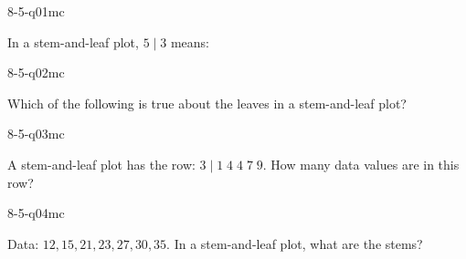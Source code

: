 

\begin{practiceQuestion}{8-5-q01}{mc}
\begin{questionText}
In a stem-and-leaf plot, $5 \mid 3$ means:
\end{questionText}
\end{practiceQuestion}

\begin{practiceQuestion}{8-5-q02}{mc}
\begin{questionText}
Which of the following is true about the leaves in a stem-and-leaf plot?
\end{questionText}
\end{practiceQuestion}

\begin{practiceQuestion}{8-5-q03}{mc}
\begin{questionText}
A stem-and-leaf plot has the row: $3 \mid 1\;4\;4\;7\;9$. How many data values are in this row?
\end{questionText}
\end{practiceQuestion}

\begin{practiceQuestion}{8-5-q04}{mc}
\begin{questionText}
Data: $12, 15, 21, 23, 27, 30, 35$. In a stem-and-leaf plot, what are the stems?
\end{questionText}
\end{practiceQuestion}

